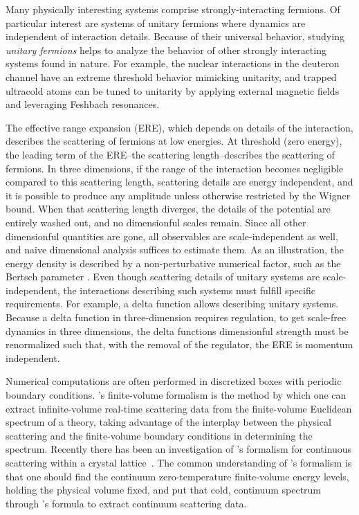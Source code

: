 Many physically interesting systems comprise strongly-interacting fermions.
Of particular interest are systems of unitary fermions where dynamics are independent of interaction details.
Because of their universal behavior, studying \emph{unitary fermions} helps to analyze the behavior of other strongly interacting systems found in nature.
For example, the nuclear interactions in the deuteron channel have an extreme threshold behavior mimicking unitarity, and trapped ultracold atoms can be tuned to unitarity by applying external magnetic fields and leveraging Feshbach resonances.

The effective range expansion (ERE), which depends on details of the interaction, describes the scattering of fermions at low energies.
At threshold (zero energy), the leading term of the ERE--the scattering length--describes the scattering of fermions.
In three dimensions, if the range of the interaction becomes negligible compared to this scattering length, scattering details are energy independent, and it is possible to produce any amplitude unless otherwise restricted by the Wigner bound\cite{Wigner:1955zz, Phillips:1996ae, Hammer:2010fw}.
When that scattering length diverges, the details of the potential are entirely washed out, and no dimensionful scales remain.
Since all other dimensionful quantities are gone, all observables are scale-independent as well, and naive dimensional analysis suffices to estimate them.
As an illustration, the energy density is described by a non-perturbative numerical factor, such as the Bertsch parameter\cite{PhysRevC.60.054311} .
Even though scattering details of unitary systems are scale-independent, the interactions describing such systems must fulfill specific requirements.
For example, a delta function allows describing unitary systems.
Because a delta function in three-dimension requires regulation, to get scale-free dynamics in three dimensions, the delta functions dimensionful strength must be renormalized such that, with the removal of the regulator, the ERE is momentum independent.

Numerical computations are often performed in discretized boxes with periodic boundary conditions.
\Luscher's finite-volume formalism\cite{Hamber198399,luscher:1986I,luscher:1986II,wiese1989,Luscher1991,Luscher1991237} is the method by which one can extract infinite-volume real-time scattering data from the finite-volume Euclidean spectrum of a theory, taking advantage of the interplay between the physical scattering and the finite-volume boundary conditions in determining the spectrum.  Recently there has been an investigation of \Luscher's formalism for continuous scattering within a crystal lattice~\cite{Valiente:2015oya}.
The common understanding of \Luscher's formalism is that one should find the continuum zero-temperature finite-volume energy levels, holding the physical volume fixed, and put that cold, continuum spectrum through \Luscher's formula to extract continuum scattering data.

